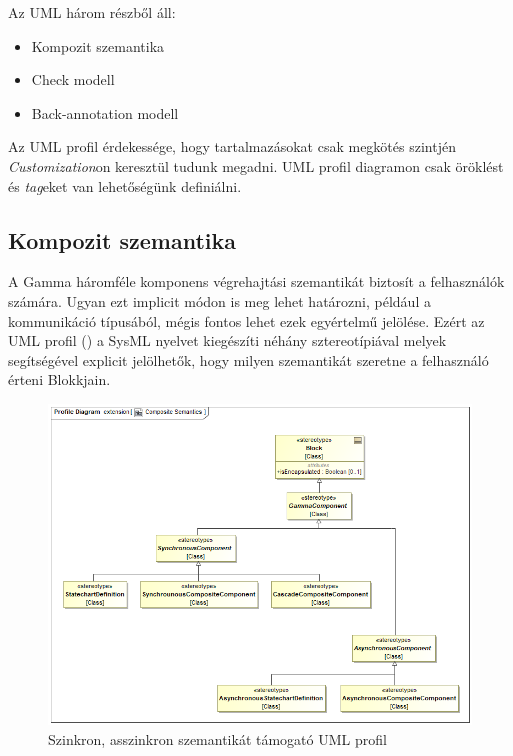 Az UML három részből áll:

\begin{itemize}
	\item Kompozit szemantika
	\item Check modell
	\item Back-annotation modell
\end{itemize}

Az UML profil érdekessége, hogy tartalmazásokat csak megkötés szintjén \emph{Customization}on keresztül tudunk megadni. UML profil diagramon csak öröklést és \emph{tag}eket van lehetőségünk definiálni.

\subsection{Kompozit szemantika}

A Gamma háromféle komponens végrehajtási szemantikát biztosít a felhasználók számára. Ugyan ezt implicit módon is meg lehet határozni, például a kommunikáció típusából, mégis fontos lehet ezek egyértelmű jelölése. Ezért az UML profil () a SysML nyelvet kiegészíti néhány sztereotípiával melyek segítségével explicit jelölhetők, hogy milyen szemantikát szeretne a felhasználó érteni Blokkjain.

\begin{figure}[!ht]
	\centering
	\includegraphics[width=130mm, keepaspectratio]{figures/contribution/profile.png}
	\caption{Szinkron, asszinkron szemantikát támogató UML profil}
	\label{fig:comp-prof}
\end{figure}

